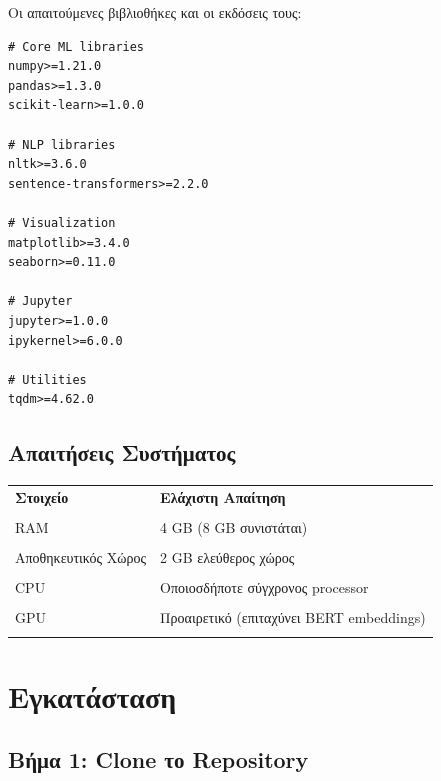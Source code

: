 \documentclass[12pt,a4paper,twoside]{book}
\begin{document}
Οι απαιτούμενες βιβλιοθήκες και οι εκδόσεις τους:

\begin{tcolorbox}[myCustomStyle={requirements.txt}]
    \begin{lstlisting}[style=myPythonStyle]
# Core ML libraries
numpy>=1.21.0
pandas>=1.3.0
scikit-learn>=1.0.0

# NLP libraries
nltk>=3.6.0
sentence-transformers>=2.2.0

# Visualization
matplotlib>=3.4.0
seaborn>=0.11.0

# Jupyter
jupyter>=1.0.0
ipykernel>=6.0.0

# Utilities
tqdm>=4.62.0
\end{lstlisting}
\end{tcolorbox}

\subsection{Απαιτήσεις Συστήματος}

\begin{table}[H]
    \centering
    \begin{tabular}{ll}
        \hline
        \textbf{Στοιχείο}   & \textbf{Ελάχιστη Απαίτηση}               \\\\
        \hline
        RAM                 & 4 GB (8 GB συνιστάται)                   \\\\
        Αποθηκευτικός Χώρος & 2 GB ελεύθερος χώρος                     \\\\
        CPU                 & Οποιοσδήποτε σύγχρονος processor         \\\\
        GPU                 & Προαιρετικό (επιταχύνει BERT embeddings) \\\\
        \hline
    \end{tabular}
\end{table}

\section{Εγκατάσταση}

\subsection{Βήμα 1: Clone το Repository}
\end{document}
